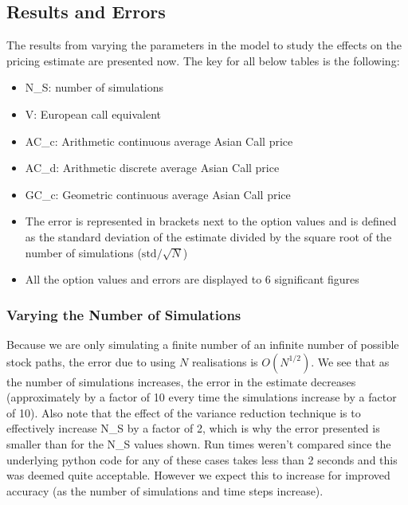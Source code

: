 \documentclass{article}
\providecommand{\tightlist}{%
      \setlength{\itemsep}{0pt}\setlength{\parskip}{0pt}}
\begin{document}
    \subsection{Results and Errors}\label{results-and-errors}

The results from varying the parameters in the model to study the
effects on the pricing estimate are presented now. The key for all below tables
is the following:

\begin{itemize}
\tightlist
\item
  N\_S: number of simulations 
\item
  V: European call equivalent
\item
  AC\_c: Arithmetic continuous average Asian Call price
\item
  AC\_d: Arithmetic discrete average Asian Call price
\item
  GC\_c: Geometric continuous average Asian Call price
\item
  The error is represented in brackets next to the option values and is
  defined as the standard deviation of the estimate divided by the
  square root of the number of simulations (\(\mathrm{std}/ \sqrt{N}\))
\item
  All the option values and errors are displayed to 6 significant
  figures
\end{itemize}

    \subsubsection{Varying the Number of
Simulations}\label{varying-the-number-of-simulations}

Because we are only simulating a finite number of an infinite number of possible stock paths, the error due to using $N$ realisations is $O(N^{1/2})$.
We see that as the number of simulations increases, the error in the
estimate decreases (approximately by a factor of 10 every time the
simulations increase by a factor of 10). Also note that the effect of
the variance reduction technique is to effectively increase N\_S by a
factor of 2, which is why the error presented is smaller than for the
N\_S values shown. Run times weren't compared since the underlying
python code for any of these cases takes less than 2 seconds and this
was deemed quite acceptable. However we expect this to increase  for improved accuracy (as the number of simulations and time steps increase).
\end{document}

